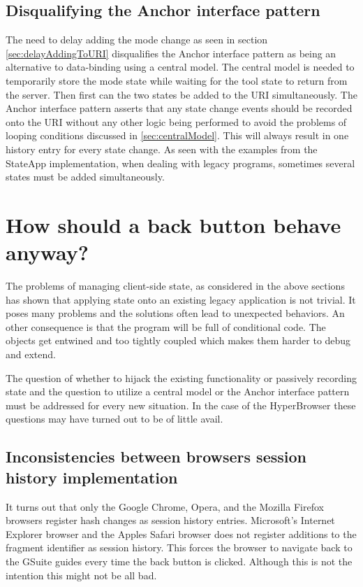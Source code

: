 \documentclass[english]{ifimaster}
\begin{document}
\subsection{Disqualifying the Anchor interface pattern}
The need to delay adding the mode change as seen in section \ref{sec:delayAddingToURI} disqualifies the Anchor interface pattern as being an alternative to data-binding using a central model. The central model is needed to temporarily store the mode state while waiting for the tool state to return from the server. Then first can the two states be added to the URI simultaneously. The Anchor interface pattern asserts that any state change events should be recorded onto the URI without any other logic being performed to avoid the problems of looping conditions discussed in \ref{sec:centralModel}. This will always result in one history entry for every state change. As seen with the examples from the StateApp implementation, when dealing with legacy programs, sometimes several states must be added simultaneously. 

\section{How should a back button behave anyway?}
\label{sec:backButtonDisc}
The problems of managing client-side state, as considered in the above sections has shown that applying state onto an existing legacy application is not trivial. It poses many problems and the solutions often lead to unexpected behaviors. An other consequence is that the program will be full of conditional code. The objects get entwined and too tightly coupled which makes them harder to debug and extend. 

The question of whether to hijack the existing functionality or passively recording state and the question to utilize a central model or the Anchor interface pattern must be addressed for every new situation. In the case of the HyperBrowser these questions may have turned out to be of little avail. 

\subsection{Inconsistencies between browsers session history implementation} 
It turns out that only the Google Chrome, Opera, and the Mozilla Firefox browsers register hash changes as session history entries. Microsoft's Internet Explorer browser and the Apples Safari browser does not register additions to the fragment identifier as session history. This forces the browser to navigate back to the GSuite guides every time the back button is clicked. Although this is not the intention this might not be all bad. 
\end{document}
